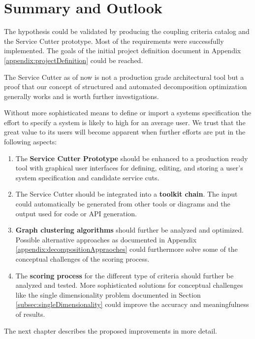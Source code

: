 \section{Summary and Outlook}

The hypothesis could be validated by producing the coupling criteria catalog and the Service Cutter prototype. Most of the requirements were successfully implemented. The goals of the initial project definition document in Appendix \ref{appendix:projectDefinition} could be reached.

The Service Cutter as of now is not a production grade architectural tool but a proof that our concept of structured and automated decomposition optimization generally works and is worth further investigations. 

Without more sophisticated means to define or import a systems specification the effort to specify a system is likely to high for an average user. We trust that the great value to its users will become apparent when further efforts are put in the following aspects:

\begin{enumerate}
	\item The \textbf{Service Cutter Prototype} should be enhanced to a production ready tool with graphical user interfaces for defining, editing, and storing a user's system specification and candidate service cuts. 
	\item The Service Cutter should be integrated into a \textbf{toolkit chain}. The input could automatically be generated from other tools or diagrams and the output used for code or \gls{API} generation.
	\item \textbf{Graph clustering algorithms} should further be analyzed and optimized. Possible alternative approaches as documented in Appendix \ref{appendix:decompositionAppraoches} could furthermore solve some of the conceptual challenges of the scoring process.
	\item The \textbf{scoring process} for the different type of criteria should further be analyzed and tested. More sophisticated solutions for conceptual challenges like the single dimensionality problem documented in Section \ref{subsec:singleDimensionality} could improve the accuracy and meaningfulness of results. 
\end{enumerate}

\bigskip

The next chapter describes the proposed improvements in more detail.
